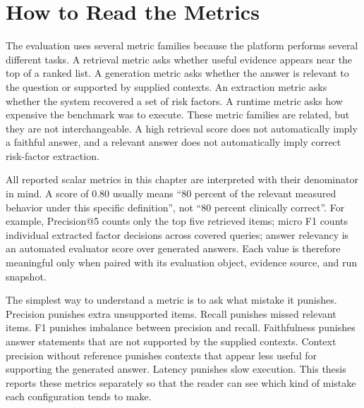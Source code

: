 \section{How to Read the Metrics}

The evaluation uses several metric families because the platform performs several different tasks. A retrieval metric asks whether useful evidence appears near the top of a ranked list. A generation metric asks whether the answer is relevant to the question or supported by supplied contexts. An extraction metric asks whether the system recovered a set of risk factors. A runtime metric asks how expensive the benchmark was to execute. These metric families are related, but they are not interchangeable. A high retrieval score does not automatically imply a faithful answer, and a relevant answer does not automatically imply correct risk-factor extraction.

All reported scalar metrics in this chapter are interpreted with their denominator in mind. A score of 0.80 usually means ``80 percent of the relevant measured behavior under this specific definition'', not ``80 percent clinically correct''. For example, Precision@5 counts only the top five retrieved items; micro F1 counts individual extracted factor decisions across covered queries; answer relevancy is an automated evaluator score over generated answers. Each value is therefore meaningful only when paired with its evaluation object, evidence source, and run snapshot.

The simplest way to understand a metric is to ask what mistake it punishes. Precision punishes extra unsupported items. Recall punishes missed relevant items. F1 punishes imbalance between precision and recall. Faithfulness punishes answer statements that are not supported by the supplied contexts. Context precision without reference punishes contexts that appear less useful for supporting the generated answer. Latency punishes slow execution. This thesis reports these metrics separately so that the reader can see which kind of mistake each configuration tends to make.

